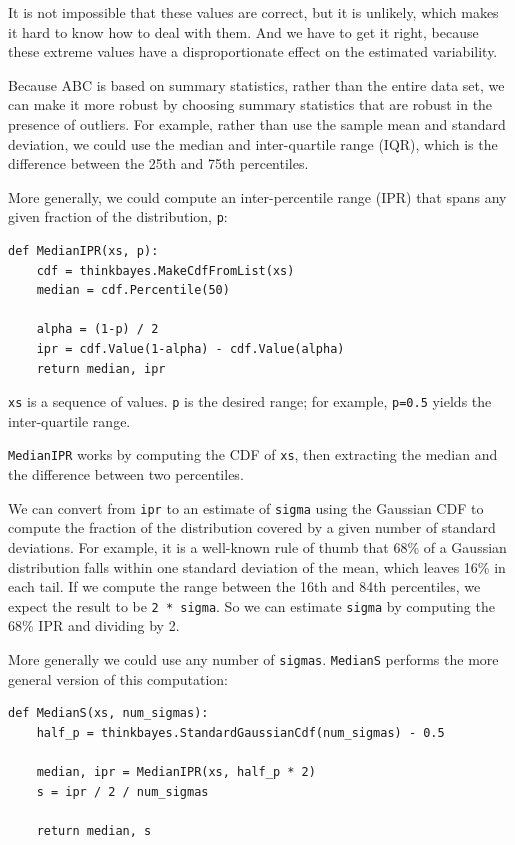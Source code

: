 \documentclass[12pt]{book}
\begin{document}
It is not impossible that these values are correct, but it is
unlikely, which makes it hard to know how to deal with them.
And we have to get
it right, because these extreme values have a disproportionate
effect on the estimated variability.

Because ABC is based on summary statistics, rather than the entire
data set, we can make it more robust by choosing summary statistics
that are robust in the presence of outliers.  For example, rather
than use the sample mean and standard deviation, we could use the median
and inter-quartile range
(IQR), which is the difference between the 25th and 75th percentiles.

More generally, we could compute an inter-percentile range (IPR) that
spans any given fraction of the distribution, {\tt p}:

\begin{verbatim}
def MedianIPR(xs, p):
    cdf = thinkbayes.MakeCdfFromList(xs)
    median = cdf.Percentile(50)

    alpha = (1-p) / 2
    ipr = cdf.Value(1-alpha) - cdf.Value(alpha)
    return median, ipr
\end{verbatim}

{\tt xs} is a sequence of values.  {\tt p} is the desired range;
for example, {\tt p=0.5} yields the inter-quartile range.

{\tt MedianIPR} works by computing the CDF of {\tt xs},
then extracting the median and the difference between two
percentiles.

We can convert from {\tt ipr} to an estimate of {\tt sigma} using the
Gaussian CDF to compute the fraction of the distribution covered by a
given number of standard deviations.  For example, it is a well-known
rule of thumb that 68\% of a Gaussian distribution falls within one
standard deviation of the mean, which leaves 16\% in each tail.  If we
compute the range between the 16th and 84th percentiles, we expect the
result to be {\tt 2 * sigma}.  So we can estimate {\tt sigma} by
computing the 68\% IPR and dividing by 2.

More generally we could use any number of {\tt sigmas}.
{\tt MedianS} performs the more general version of this
computation:

\begin{verbatim}
def MedianS(xs, num_sigmas):
    half_p = thinkbayes.StandardGaussianCdf(num_sigmas) - 0.5

    median, ipr = MedianIPR(xs, half_p * 2)
    s = ipr / 2 / num_sigmas

    return median, s
\end{verbatim}
\end{document}
